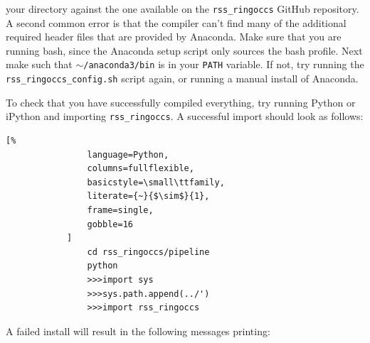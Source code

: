 \documentclass[titlepage, 12pt]{article}
\begin{document}
            your directory against the one available on the \texttt{rss\_ringoccs} GitHub repository.
            A second common error is that the compiler can't
            find many of the additional required header files that
            are provided by Anaconda. Make sure that you are running
            bash, since the Anaconda setup script only sources the
            bash profile. Next make such that
            \texttt{$\sim$/anaconda3/bin} is in your
            \texttt{PATH} variable. If not, try running the
            \texttt{rss\_ringoccs\_config.sh} script again, or
            running a manual install of Anaconda.
            \par\hfill\par
            To check that you have successfully compiled everything,
            try running Python or iPython and importing
            \texttt{rss\_ringoccs}. A successful import should look
            as follows:
            \begin{lstlisting}[%
                language=Python,
                columns=fullflexible,
                basicstyle=\small\ttfamily,
                literate={~}{$\sim$}{1},
                frame=single,
                gobble=16
            ]
                cd rss_ringoccs/pipeline
                python
                >>>import sys
                >>>sys.path.append(../')
                >>>import rss_ringoccs
            \end{lstlisting}
            A failed install will result in the following messages
            printing:
\end{document}

